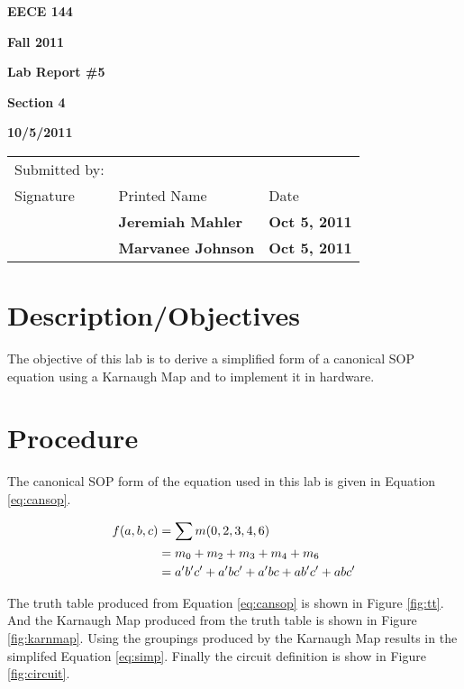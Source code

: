 \documentclass[12pt]{article}
\begin{document}

\centerline{\bf EECE 144}
\centerline{\bf Fall 2011}
\centerline{\bf}
\centerline{\bf Lab Report \#5}
\centerline{\bf Section 4}
\centerline{\bf 10/5/2011}

\begin{center}
\begin{tabularx}{\textwidth}[b]{X l l}
Submitted by: & & \\
Signature & Printed Name & Date \\
\hline
\multicolumn{1}{|X|}{} & \multicolumn{1}{|l|}{\bigstrut \bf Jeremiah Mahler} & \multicolumn{1}{|l|}{\bf Oct 5, 2011} \\
\hline
\multicolumn{1}{|X|}{} & \multicolumn{1}{|l|}{\bigstrut \bf Marvanee Johnson} & \multicolumn{1}{|l|}{\bf Oct 5, 2011} \\
\hline
\end{tabularx}
\end{center}

\section{Description/Objectives}

The objective of this lab is to derive a simplified form
of a canonical SOP equation using a Karnaugh Map and
to implement it in hardware.

\section{Procedure}
\label{sec:procedure}

The canonical SOP form of the equation used in this lab is
given in Equation \ref{eq:cansop}.

\begin{align}
f(a, b, c) &= \sum m(0, 2, 3, 4, 6) \label{eq:cansop} \\
	    &= m_0 + m_2 + m_3 + m_4 + m_6 \notag \\
		&= a' b' c' + a' b c' + a' b c + a b' c' + a b c' \notag
\end{align}

The truth table produced from Equation \ref{eq:cansop}
is shown in Figure \ref{fig:tt}.
And the Karnaugh Map produced from the truth table
is shown in Figure \ref{fig:karnmap}.
Using the groupings produced by the Karnaugh Map results in
the simplifed Equation \ref{eq:simp}.
Finally the circuit definition is show in Figure \ref{fig:circuit}.
\end{document}
